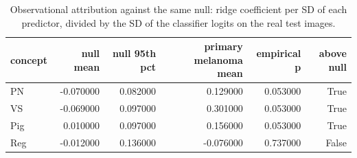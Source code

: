 \begin{table}
\caption{Observational attribution against the same null: ridge coefficient per SD of each predictor, divided by the SD of the classifier logits on the real test images.}
\label{tab:T7_observational_null}
\begin{tabular}{lrrrrr}
\toprule
concept & null mean & null 95th pct & primary melanoma mean & empirical p & above null \\
\midrule
PN & -0.070000 & 0.082000 & 0.129000 & 0.053000 & True \\
VS & -0.069000 & 0.097000 & 0.301000 & 0.053000 & True \\
Pig & 0.010000 & 0.097000 & 0.156000 & 0.053000 & True \\
Reg & -0.012000 & 0.136000 & -0.076000 & 0.737000 & False \\
\bottomrule
\end{tabular}
\end{table}

